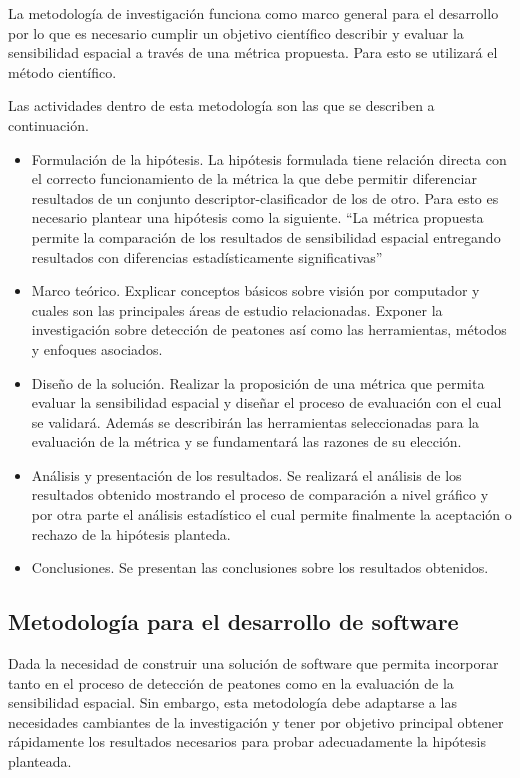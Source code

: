 La metodología de investigación funciona como marco general para el desarrollo por lo que es necesario cumplir un objetivo científico \ie describir y evaluar la sensibilidad espacial a través de una métrica propuesta. Para esto se utilizará el método científico.

Las actividades dentro de esta metodología son las que se describen a continuación.

\begin{itemize}
\item Formulación de la hipótesis. 
La hipótesis formulada tiene relación directa con el correcto funcionamiento de la métrica la que debe permitir diferenciar resultados de un conjunto descriptor-clasificador de los de otro. Para esto es necesario plantear una hipótesis como la siguiente.
\subitem ``La métrica propuesta permite la comparación de los resultados de sensibilidad espacial entregando resultados con diferencias estadísticamente significativas''
\item Marco teórico. Explicar conceptos básicos sobre visión por computador y cuales son las principales áreas de estudio relacionadas. Exponer la investigación sobre detección de peatones así como las herramientas, métodos y enfoques asociados.
\item Diseño de la solución. Realizar la proposición de una métrica que permita evaluar la sensibilidad espacial y diseñar el proceso de evaluación con el cual se validará. Además se describirán las herramientas seleccionadas para la evaluación de la métrica y se fundamentará las razones de su elección.
\item Análisis y presentación de los resultados. Se realizará el análisis de los resultados obtenido mostrando el proceso de comparación a nivel gráfico y por otra parte el análisis estadístico el cual permite finalmente la aceptación o rechazo de la hipótesis planteda.   
\item Conclusiones. Se presentan las conclusiones sobre los resultados obtenidos.

\end{itemize}

\subsection{Metodolog\'ia para el desarrollo de software}


Dada la necesidad de construir una solución de software que permita incorporar tanto en el proceso de detección de peatones como en la evaluación de la sensibilidad espacial. Sin embargo, esta metodología debe adaptarse a las necesidades cambiantes de la investigación y tener por objetivo principal obtener rápidamente los resultados necesarios para probar adecuadamente la hipótesis planteada.

